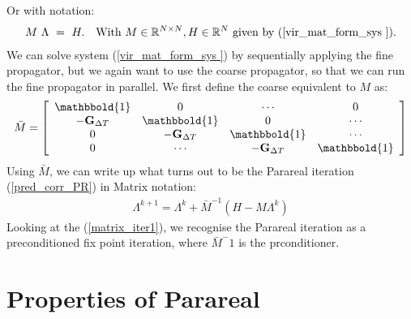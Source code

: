 Or with notation:
\begin{align}
M \ \Lambda \ = \ H.\quad \textrm{With $M\in\mathbb{R}^{N\times N},H\in\mathbb{R}^N$ given by (\ref{vir_mat_form_sys }).} \label{vir_mat_sys}
\end{align}
We can solve system (\ref{vir_mat_form_sys }) by sequentially applying the fine propagator, but we again want to use the coarse propagator, so that we can run the fine propagator in parallel. We first define the coarse equivalent to $M$ as:
\begin{align}
\bar{M} = \left[ \begin{array}{cccc}
   \mathbbold{1} & 0 & \cdots & 0 \\  
   -\bold{G}_{\Delta T} & \mathbbold{1} & 0 & \cdots \\ 
   0 &-\bold{G}_{\Delta T} & \mathbbold{1}  & \cdots \\
   0 &\cdots &-\bold{G}_{\Delta T} & \mathbbold{1}   \\
   \end{array}  \right]
\end{align}
Using $\bar{M}$, we can write up what turns out to be the Parareal iteration (\ref{pred_corr_PR}) in Matrix notation:
\begin{align}
\Lambda^{k+1} = \Lambda^k + \bar{M}^{-1}(H-M\Lambda^k) \label{matrix_iter1}
\end{align}
Looking at the (\ref{matrix_iter1}), we recognise the Parareal iteration as a preconditioned fix point iteration, where $\bar{M}^-1$ is the prconditioner.
\section{Properties of Parareal}
